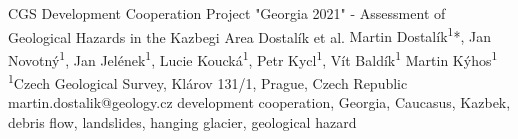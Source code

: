 \abstract
{CGS Development Cooperation Project "Georgia 2021" - Assessment of Geological Hazards in the Kazbegi Area} 
{Dostalík et al.} 
{Martin Dostalík\textsuperscript{1}*, Jan Novotný\textsuperscript{1}, Jan Jelének\textsuperscript{1}, Lucie Koucká\textsuperscript{1}, Petr Kycl\textsuperscript{1}, Vít Baldík\textsuperscript{1} Martin Kýhos\textsuperscript{1}} 
{\KLtag} 
{
	\textsuperscript{1}Czech Geological Survey, Klárov 131/1, Prague, Czech Republic
}
{martin.dostalik@geology.cz}  %
{development cooperation, Georgia, Caucasus, Kazbek, debris flow, landslides, hanging glacier, geological hazard}

